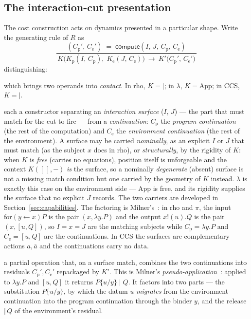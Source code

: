 \documentclass[11pt]{article}
\theoremstyle{definition}
\theoremstyle{plain}
\newcommand{\red}{\longrightarrow}
\newcommand{\compute}{\mathsf{compute}}
\newcommand{\Kp}{K_{\mathrm{p}}}
\newcommand{\Ke}{K_{\mathrm{e}}}
\newcommand{\Par}{\mathbin{|}}
\begin{document}
\subsection{The interaction-cut presentation}

The cost construction acts on dynamics presented in a particular shape.
Write the generating rule of $R$ as
%
\begin{equation}
  \frac{(C_{\mathrm p}',\,C_{\mathrm e}') \;=\;
        \compute(I,\,J,\,C_{\mathrm p},\,C_{\mathrm e})}
       {\,K\bigl(\Kp(I,\,C_{\mathrm p}),\; \Ke(J,\,C_{\mathrm e})\bigr)
        \ \red\
        K'\bigl(C_{\mathrm p}',\,C_{\mathrm e}'\bigr)\,}
  \tag{$\dagger$}
  \label{eq:metered-cut}
\end{equation}
%
distinguishing:
%
\begin{description}[leftmargin=2.2em,itemsep=2pt]
  \item[the interaction constructor $K$,] which brings two operands into
    \emph{contact}. In rho, $K = {\Par}$; in $\lambda$, $K = \mathrm{App}$;
    in CCS, $K = {\Par}$.
  \item[two introductions $\Kp(I,C_{\mathrm p})$ and
    $\Ke(J,C_{\mathrm e})$,] each a constructor separating an
    \emph{interaction surface} ($I$, $J$) --- the part that must match for
    the cut to fire --- from a \emph{continuation}: $C_{\mathrm p}$ the
    \emph{program continuation} (the rest of the computation) and
    $C_{\mathrm e}$ the \emph{environment continuation} (the rest of the
    environment). A surface may be carried \emph{nominally}, as an
    explicit $I$ or $J$ that must match (as the subject $x$ does in rho),
    or \emph{structurally}, by the rigidity of $K$: when $K$ is
    \emph{free} (carries no equations), position itself is unforgeable and
    the context $K([\,],-)$ \emph{is} the surface, so a nominally
    \emph{degenerate} (absent) surface is not a missing match condition but
    one carried by the geometry of $K$ instead. $\lambda$ is exactly this
    case on the environment side --- $\mathrm{App}$ is free, and its
    rigidity supplies the surface that no explicit $J$ records. The two
    carriers are developed in Section~\ref{sec:capabilities}. The factoring is
    Milner's~\cite{MilnerPolyadic1993}: in
    rho and $\pi$, the input $\mathrm{for}(y\leftarrow x)P$ is the pair
    $(x,\lambda y.P)$ and the output $x!(u).Q$ is the pair $(x,[u,Q])$, so
    $I = x = J$ are the matching subjects while $C_{\mathrm p} = \lambda
    y.P$ and $C_{\mathrm e} = [u,Q]$ are the continuations. In CCS the
    surfaces are complementary actions $a, \bar a$ and the continuations
    carry no data.
  \item[the contraction $\compute$,] a partial operation that, on a
    surface match, combines the two continuations into residuals
    $C_{\mathrm p}', C_{\mathrm e}'$ repackaged by $K'$. This is Milner's
    \emph{pseudo-application}~\cite{MilnerPolyadic1993}: applied to
    $\lambda y.P$ and $[u,Q]$ it returns $P\{u/y\} \mathbin{|} Q$. It
    factors into two parts --- the substitution $P\{u/y\}$, by which the
    datum $u$ \emph{migrates} from the environment continuation into the
    program continuation through the binder $y$, and the release
    $\mathbin{|}\,Q$ of the environment's residual.
\end{description}
\end{document}
